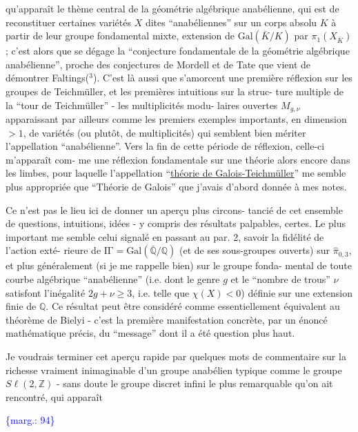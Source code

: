 \documentclass[11pt]{article}
\newcommand{\scanpage}[1]{\par\bigskip\noindent{\small\sffamily[scan #1]}\par}
\newcommand{\mspage}[1]{{\small\sffamily[p.\,#1]}}
\newcommand{\margin}[1]{\textcolor{blue}{\{\textsf{marg.:} #1\}}}
\newcommand{\uline}[1]{\underline{#1}}
\begin{document}
qu'apparaît le thème central de la géométrie algébrique anabélienne,
qui est de reconstituer certaines variétés $X$ dites ``anabéliennes''
sur un corps absolu $K$ à partir de leur groupe fondamental mixte,
extension de $\mathrm{Gal}(\bar{K}/K)$ par $\pi_1(X_{\bar{K}})$ ; c'est alors que se dégage la
``conjecture fondamentale de la géométrie algébrique anabélienne'',
proche des conjectures de Mordell et de Tate que vient de démontrer
Faltings($^3$). C'est là aussi que s'amorcent une première réflexion sur
les groupes de Teichmüller, et les premières intuitions sur la struc-%
ture multiple de la ``tour de Teichmüller'' - les multiplicités modu-%
laires ouvertes $M_{g,\nu}$ apparaissant par ailleurs comme les premiers
exemples importants, en dimension $> 1$, de variétés (ou plutôt, de
multiplicités) qui semblent bien mériter l'appellation ``anabélienne''.
Vers la fin de cette période de réflexion, celle-ci m'apparaît com-%
me une réflexion fondamentale sur une théorie alors encore dans les
limbes, pour laquelle l'appellation ``\uline{théorie de Galois-Teichmüller}''
me semble plus appropriée que ``Théorie de Galois'' que j'avais d'abord
donnée à mes notes.

Ce n'est pas le lieu ici de donner un aperçu plus circons-%
tancié de cet ensemble de questions, intuitions, idées - y compris
des résultats palpables, certes. Le plus important me semble celui
signalé en passant au par. 2, savoir la fidélité de l'action exté-%
rieure de $\mathrm{I\Gamma} = \mathrm{Gal}(\bar{\mathbb{Q}}/\mathbb{Q})$ (et de ses sous-groupes ouverts) sur $\hat{\pi}_{0,3}$,
et plus généralement (si je me rappelle bien) sur le groupe fonda-%
mental de toute courbe algébrique ``anabélienne'' (i.e. dont le genre
$g$ et le ``nombre de trous'' $\nu$ satisfont l'inégalité $2g + \nu \geq 3$,
i.e. telle que $\chi(X) < 0$) définie sur une extension finie de $\mathbb{Q}$. Ce
résultat peut être considéré comme essentiellement équivalent au
théorème de Bielyi - c'est la première manifestation concrète, par
un énoncé mathématique précis, du ``message'' dont il a été question
plus haut.

Je voudrais terminer cet aperçu rapide par quelques mots
de commentaire sur la richesse vraiment inimaginable d'un groupe
anabélien typique comme le groupe $S\ell(2,\mathbb{Z})$ - sans doute le groupe
discret infini le plus remarquable qu'on ait rencontré, qui apparaît

\margin{94}

\clearpage
\scanpage{119/95}
\mspage{17}
\end{document}
